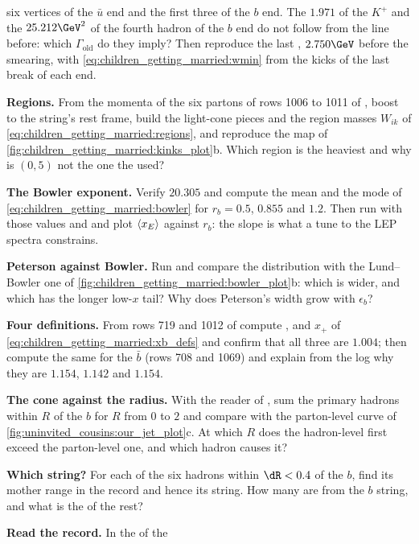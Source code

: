 \begin{exercises}
  six vertices of the $\bar u$ end and the first three of the $b$ end. The
  $1.971$ of the $K^+$ and the $25.212\GeV^2$ of the fourth hadron of the
  $b$ end do not follow from the line before: which $\Gamma_{\mathrm{old}}$
  do they imply? Then reproduce the last \Wmin, $2.750\GeV$ before the
  smearing, with \cref{eq:children_getting_married:wmin} from the kicks
  of the last break of each end.
\item \textbf{Regions.} From the momenta of the six partons of rows 1006 to
  1011 of , boost to the string's rest frame, build
  the light-cone pieces and the region masses $W_{ik}$ of
  \cref{eq:children_getting_married:regions}, and reproduce the map of
  \cref{fig:children_getting_married:kinks_plot}b. Which region is the
  heaviest and why is $(0,5)$ not the one the \Bstarbar used?
\item \textbf{The Bowler exponent.} Verify $20.305$ and compute the mean
  and the mode of \cref{eq:children_getting_married:bowler} for
  $r_b=0.5$, $0.855$ and $1.2$. Then run  with those values
  and  and plot $\langle x_E\rangle$ against $r_b$: the
  slope is what a tune to the LEP spectra constrains.
\item \textbf{Peterson against Bowler.} Run 
  and compare the \xE distribution with the Lund--Bowler one of
  \cref{fig:children_getting_married:bowler_plot}b: which is wider, and
  which has the longer low-$x$ tail? Why does Peterson's width grow with
  $\epsilon_b$?
\item \textbf{Four definitions.} From rows 719 and 1012 of
   compute \xE, \xpt and $x_+$ of
  \cref{eq:children_getting_married:xb_defs} and confirm that all three
  are $1.004$; then compute the same for the $\bar b$ (rows 708 and 1069)
  and explain from the log why they are $1.154$, $1.142$ and $1.154$.
\item \textbf{The cone against the radius.} With the reader of
  , sum the primary hadrons within $R$ of the $b$
  for $R$ from $0$ to $2$ and compare with the parton-level curve of
  \cref{fig:uninvited_cousins:our_jet_plot}c. At which $R$ does the
  hadron-level \pt first exceed the parton-level one, and which hadron
  causes it?
\item \textbf{Which string?} For each of the six hadrons within $\dR<0.4$
  of the $b$, find its mother range in the record and hence its string.
  How many are from the $b$ string, and what is the \pt of the rest?
\item \textbf{Read the \CMSSW record.} In the  of the

\end{exercises}
